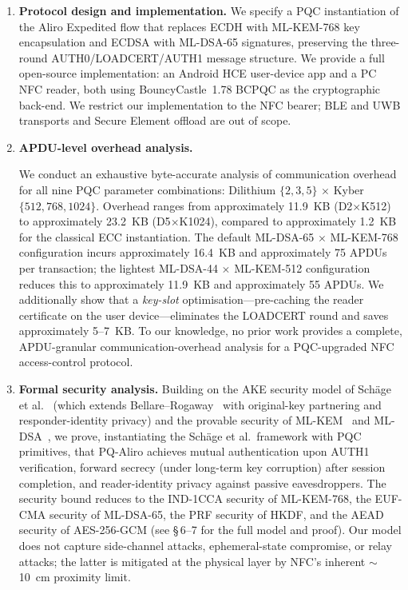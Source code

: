 \documentclass[runningheads]{llncs}
\begin{document}
\begin{enumerate}

\item \textbf{Protocol design and implementation.}
We specify a PQC instantiation of the Aliro Expedited flow that replaces ECDH with ML-KEM-768 key encapsulation and ECDSA with ML-DSA-65 signatures, preserving the three-round AUTH0/LOADCERT/AUTH1 message structure. We provide a full open-source implementation: an Android HCE user-device app and a PC NFC reader, both using BouncyCastle~1.78 BCPQC as the cryptographic back-end. We restrict our implementation to the NFC bearer; BLE and UWB transports and Secure Element offload are out of scope.

\item \textbf{APDU-level overhead analysis.}
{\sloppy
We conduct an exhaustive byte-accurate analysis of communication overhead for all nine PQC parameter combinations: Dilithium $\{2,3,5\}$ $\times$ Kyber $\{512,768,1024\}$. Overhead ranges from approximately 11.9~KB (D2$\times$K512) to approximately 23.2~KB (D5$\times$K1024), compared to approximately 1.2~KB for the classical ECC instantiation. The default ML-DSA-65 $\times$ ML-KEM-768 configuration incurs approximately 16.4~KB and approximately 75 APDUs per transaction; the lightest ML-DSA-44 $\times$ ML-KEM-512 configuration reduces this to approximately 11.9~KB and approximately 55 APDUs. We additionally show that a \emph{key-slot} optimisation---pre-caching the reader certificate on the user device---eliminates the LOADCERT round and saves approximately 5--7~KB. To our knowledge, no prior work provides a complete, APDU-granular communication-overhead analysis for a PQC-upgraded NFC access-control protocol.
\par}

\item \textbf{Formal security analysis.}
Building on the AKE security model of Sch{\"a}ge et al.~\cite{PKC:SchSchLau20} (which extends Bellare--Rogaway~\cite{C:BelRog93} with original-key partnering and responder-identity privacy) and the provable security of ML-KEM~\cite{EuroSP:BDKLLSSSS18} and ML-DSA~\cite{TCHES:DKLLSSS18}, we prove, instantiating the Sch{\"a}ge et al.~framework with PQC primitives, that PQ-Aliro achieves mutual authentication upon AUTH1 verification, forward secrecy (under long-term key corruption) after session completion, and reader-identity privacy against passive eavesdroppers. The security bound reduces to the IND-1CCA security of ML-KEM-768, the EUF-CMA security of ML-DSA-65, the PRF security of HKDF, and the AEAD security of AES-256-GCM (see \S\,6--7 for the full model and proof). Our model does not capture side-channel attacks, ephemeral-state compromise, or relay attacks; the latter is mitigated at the physical layer by NFC's inherent $\sim$10~cm proximity limit.


\end{enumerate}
\end{document}
